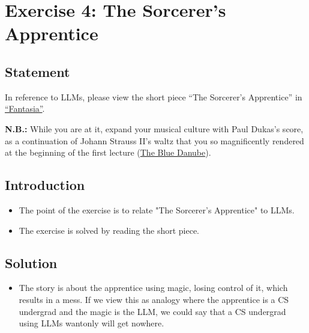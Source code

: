 \documentclass[12pt]{article}
\begin{document}

\newpage

\section{Exercise 4: The Sorcerer's Apprentice}


\subsection{Statement}

In reference to LLMs, please view the short piece ``The Sorcerer's Apprentice''
in \href{https://en.wikipedia.org/wiki/Fantasia_(1940_film)}{``Fantasia''}.

\textbf{N.B.:} While you are at it, expand your musical culture with Paul
Dukas's score, as a continuation of Johann Strauss II's waltz that you so
magnificently rendered at the beginning of the first lecture
(\href{https://en.wikipedia.org/wiki/The_Blue_Danube}{The Blue Danube}).


\subsection{Introduction}

\begin{itemize}

\item
  The point of the exercise is to relate "The Sorcerer's Apprentice" to LLMs.

\item
  The exercise is solved by reading the short piece.

\end{itemize}


\subsection{Solution}

\begin{itemize}
\item The story is about the apprentice using magic, losing control of it, which results in a mess. If we view this as analogy where the apprentice is a CS undergrad and the magic is the LLM, we could say that a CS undergrad using LLMs wantonly will get nowhere. 
\end{itemize}
\end{document}
